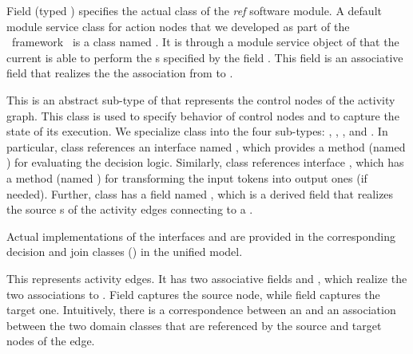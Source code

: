 \begin{description}
Field  (typed ) specifies the actual  class of the \textit{ref} software module. 
A default module service class for action nodes that we developed as part of the \jdomainapp~framework~\cite{le_jdomainapp_2017} is a class named .
It is through a module service object of  that the current  is able to perform the s specified by the field . This field is an associative field that realizes the the association from  to .
%
\item[\clazz{ControlNode}.] This is an abstract sub-type of  that represents the control nodes of the activity graph. This class is used to specify behavior of control nodes and to capture the state of its execution. We specialize class  into the four sub-types: , , , and . 
In particular, class  references an interface named , which provides a method (named ) for evaluating the decision logic. Similarly, class  references interface , which has a method (named ) for transforming the input tokens into output ones (if needed).
Further, class  has a field named , which is a derived field that realizes the source s of the activity edges connecting to a .

Actual implementations of the interfaces  and  are provided in the corresponding decision and join classes (\resp) in the unified model.
%
\item[\clazz{Edge}.] This represents activity edges. It has two associative fields  and , which realize the two associations to . Field  captures the source node, while field  captures the target one. Intuitively, there is a correspondence between an  and an association between the two domain classes that are referenced by the source and target nodes of the edge.
\end{description}

